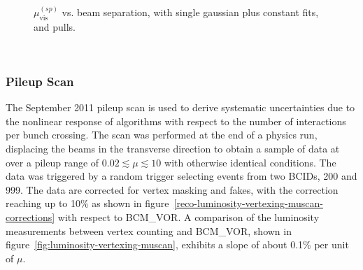 \begin{figure}[htbp]
{		
	}\\
	\caption{$\mu_{\textrm{vis}}^{(sp)}$ vs. beam separation, with single gaussian plus constant fits, and pulls.}
	\label{fig:luminosity-vertex-vdm}
\end{figure}

\ 

\subsubsection{Pileup Scan}

The September 2011 pileup scan is used to derive systematic uncertainties due to the nonlinear response of algorithms with respect to the number of interactions per bunch crossing. The scan was performed at the end of a physics run, displacing the beams in the transverse direction to obtain a sample of data at over a pileup range of $0.02\lesssim \mu \lesssim 10$ with otherwise identical conditions. The data was triggered by a random trigger selecting events from two BCIDs, 200 and 999. The data are corrected for vertex masking and fakes, with the correction reaching up to 10\% as shown in figure~\ref{reco-luminosity-vertexing-muscan-corrections} with respect to BCM\_VOR. A comparison of the luminosity measurements between vertex counting and BCM\_VOR, shown in figure~\ref{fig:luminosity-vertexing-muscan}, exhibits a slope of about 0.1\% per unit of $\mu$. 

